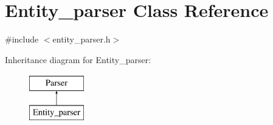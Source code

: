 \hypertarget{class_entity__parser}{\section{Entity\-\_\-parser Class Reference}
\label{class_entity__parser}
}


{\ttfamily \#include $<$entity\-\_\-parser.\-h$>$}

Inheritance diagram for Entity\-\_\-parser\-:\begin{figure}[H]
\begin{center}
\leavevmode
\includegraphics[height=2.000000cm]{class_entity__parser}
\end{center}
\end{figure}
